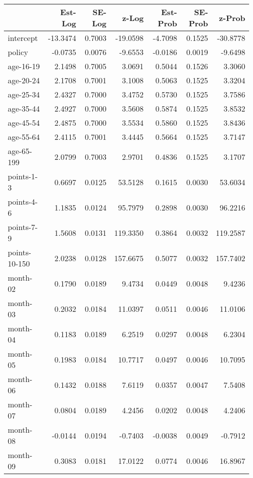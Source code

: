 \documentclass[10pt]{article}
\begin{document}
\begin{table}[ht]
\centering
\begin{tabular}{lrrrrrr}
  \hline
 & Est-Log & SE-Log & z-Log & Est-Prob & SE-Prob & z-Prob \\ 
  \hline
intercept & -13.3474 & 0.7003 & -19.0598 & -4.7098 & 0.1525 & -30.8778 \\ 
  policy & -0.0735 & 0.0076 & -9.6553 & -0.0186 & 0.0019 & -9.6498 \\ 
  age-16-19 & 2.1498 & 0.7005 & 3.0691 & 0.5044 & 0.1526 & 3.3060 \\ 
  age-20-24 & 2.1708 & 0.7001 & 3.1008 & 0.5063 & 0.1525 & 3.3204 \\ 
  age-25-34 & 2.4327 & 0.7000 & 3.4752 & 0.5730 & 0.1525 & 3.7586 \\ 
  age-35-44 & 2.4927 & 0.7000 & 3.5608 & 0.5874 & 0.1525 & 3.8532 \\ 
  age-45-54 & 2.4875 & 0.7000 & 3.5534 & 0.5860 & 0.1525 & 3.8436 \\ 
  age-55-64 & 2.4115 & 0.7001 & 3.4445 & 0.5664 & 0.1525 & 3.7147 \\ 
  age-65-199 & 2.0799 & 0.7003 & 2.9701 & 0.4836 & 0.1525 & 3.1707 \\ 
  points-1-3 & 0.6697 & 0.0125 & 53.5128 & 0.1615 & 0.0030 & 53.6034 \\ 
  points-4-6 & 1.1835 & 0.0124 & 95.7979 & 0.2898 & 0.0030 & 96.2216 \\ 
  points-7-9 & 1.5608 & 0.0131 & 119.3350 & 0.3864 & 0.0032 & 119.2587 \\ 
  points-10-150 & 2.0238 & 0.0128 & 157.6675 & 0.5077 & 0.0032 & 157.7402 \\ 
  month-02 & 0.1790 & 0.0189 & 9.4734 & 0.0449 & 0.0048 & 9.4236 \\ 
  month-03 & 0.2032 & 0.0184 & 11.0397 & 0.0511 & 0.0046 & 11.0106 \\ 
  month-04 & 0.1183 & 0.0189 & 6.2519 & 0.0297 & 0.0048 & 6.2304 \\ 
  month-05 & 0.1983 & 0.0184 & 10.7717 & 0.0497 & 0.0046 & 10.7095 \\ 
  month-06 & 0.1432 & 0.0188 & 7.6119 & 0.0357 & 0.0047 & 7.5408 \\ 
  month-07 & 0.0804 & 0.0189 & 4.2456 & 0.0202 & 0.0048 & 4.2406 \\ 
  month-08 & -0.0144 & 0.0194 & -0.7403 & -0.0038 & 0.0049 & -0.7912 \\ 
  month-09 & 0.3083 & 0.0181 & 17.0122 & 0.0774 & 0.0046 & 16.8967 \\ 

\end{tabular}
\end{table}
\end{document}
